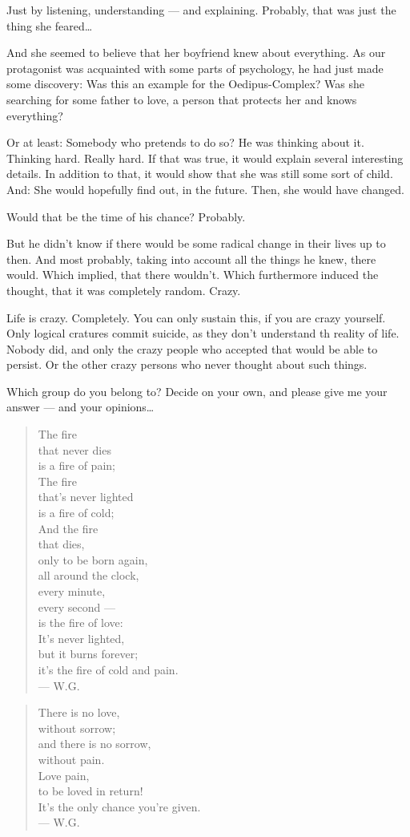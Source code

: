 Just by listening, understanding --- and explaining. 
Probably, that was just the thing she feared\dots{}

And she seemed to believe that her boyfriend knew about everything. 
As our protagonist was acquainted with some parts of psychology, he had just made some discovery: Was this an example for the Oedipus-Complex? Was she searching for some father to love, a person that protects her and knows everything?

Or at least: Somebody who pretends to do so?
He was thinking about it. 
Thinking hard. 
Really hard. 
If that was true, it would explain several interesting details. 
In addition to that, it would show that she was still some sort of child. 
And: She would hopefully find out, in the future. 
Then, she would have changed.

Would that be the time of his chance?
Probably.

But he didn't know if there would be some radical change in their lives up to then. 
And most probably, taking into account all the things he knew, there would. 
Which implied, that there wouldn't. 
Which furthermore induced the thought, that it was completely random. 
Crazy.

Life is crazy. 
Completely. 
You can only sustain this, if you are crazy yourself. Only logical cratures commit suicide, as they don't understand th reality of life. 
Nobody did, and only the crazy people who accepted that would be able to persist. 
Or the other crazy persons who never thought about such things.

Which group do you belong to?
Decide on your own, and please give me your answer --- and your opinions\dots{}

\begin{quote}
The fire \\
that never dies \\
is a fire of pain; \\
The fire \\
that's never lighted \\
is a fire of cold;\\
And the fire \\
that dies, \\
only to be born again, \\
all around the clock, \\
every minute, \\
every second --- \\
is the fire of love: \\
It's never lighted, \\
but it burns forever; \\
it's the fire of cold and pain. \\
--- W.G.
\end{quote}

\begin{quote}
There is no love, \\
without sorrow; \\
and there is no sorrow, \\
without pain. \\
Love pain, \\
to be loved in return! \\
It's the only chance you're given. \\
--- W.G.
\end{quote}
